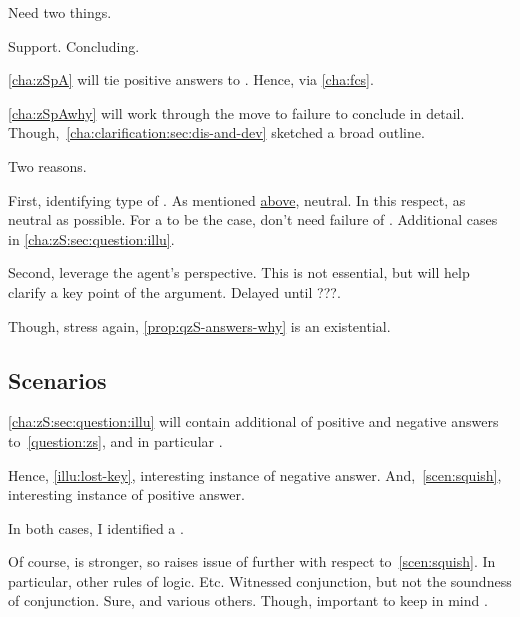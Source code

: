 \begin{note}
  Need two things.

  Support.
  Concluding.

  \autoref{cha:zSpA} will tie positive answers to .
  Hence, \support{} via \autoref{cha:fcs}.

  \autoref{cha:zSpAwhy} will work through the move to failure to conclude in detail.
  Though,~\autoref{cha:clarification:sec:dis-and-dev} sketched a broad outline.

  Two reasons.

  First, identifying type of \scen{}.
  As mentioned \hyperref[qzS:intro:qualification]{above}, neutral.
  In this respect, as neutral as possible.
  For a \scen{} to be the case, don't need failure of \issueConstraint{}.
  Additional cases in \autoref{cha:zS:sec:question:illu}.

  Second, leverage the agent's perspective.
  This is not essential, but will help clarify a key point of the argument.
  Delayed until {\color{blue} ???}.

  Though, stress again, \autoref{prop:qzS-answers-why} is an existential.
\end{note}

\subsection{Scenarios}
\label{cha:zS:sec:question:scenarios}

\begin{note}
  \autoref{cha:zS:sec:question:illu} will contain additional  of positive and negative answers to~\autoref{question:zs}, and in particular .
\end{note}

\begin{note}
  Hence, \autoref{illu:lost-key}, interesting instance of negative answer.
  And,~\autoref{scen:squish}, interesting instance of positive answer.

  In both cases, I identified a \requ{}.

  Of course, \qzS{} is stronger, so raises issue of further  with respect to~\autoref{scen:squish}.
  In particular, other rules of logic.
  Etc.
  Witnessed conjunction, but not the soundness of conjunction.
  Sure, and various others.
  Though, important to keep in mind \requ{}.
\end{note}

